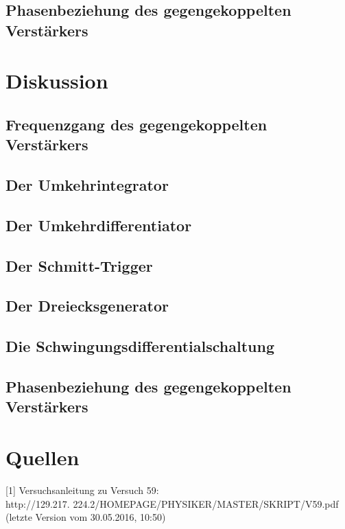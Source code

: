 \documentclass[]{scrartcl}
\begin{document}
\subsection{Phasenbeziehung des gegengekoppelten Verstärkers}

\section{Diskussion}

\subsection{Frequenzgang des gegengekoppelten Verstärkers}

\subsection{Der Umkehrintegrator}

\subsection{Der Umkehrdifferentiator}

\subsection{Der Schmitt-Trigger}

\subsection{Der Dreiecksgenerator}

\subsection{Die Schwingungsdifferentialschaltung}

\subsection{Phasenbeziehung des gegengekoppelten Verstärkers}

\section{Quellen}
{[1]} Versuchsanleitung zu Versuch 59: \\
http://129.217.
224.2/HOMEPAGE/PHYSIKER/MASTER/SKRIPT/V59.pdf (letzte Version vom 30.05.2016, 10:50)\\
\end{document}
